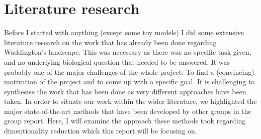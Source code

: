 \documentclass[journal, a4paper]{IEEEtran}
\begin{document}



	

%
%

\section{Literature research}



Before I started with anything (except some toy models) I did some extensive literature research on the work that has already been done regarding Waddington's landscape. This was necessary as there was no specific task given, and no underlying biological question that needed to be answered. It was probably one of the major challenges of the whole project: To find a (convincing) motivation of the project and to come up with a specific goal.
It is challenging to synthesise the work that has been done as very different approaches have been taken. In order to situate our work within the wider literature, we highlighted the major state-of-the-art methods that have been developed by other groups in the group report.
Here, I will examine the approach these methods took regarding dimentionality reduction which this report will be focusing on. 
\end{document}
